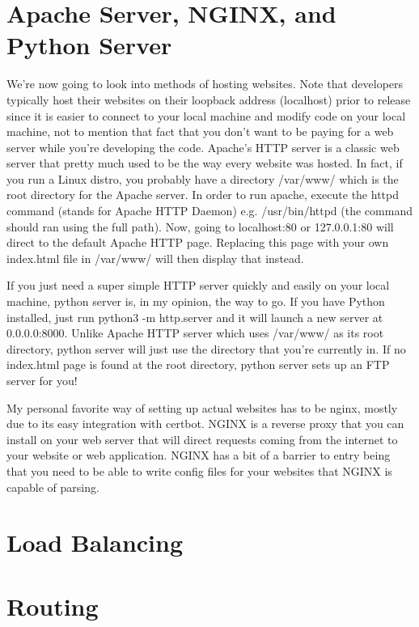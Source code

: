 \documentclass{article}
\begin{document}
\section{Apache Server, NGINX, and Python Server}

We're now going to look into methods of hosting websites. Note that developers typically host their websites on
their loopback address (localhost) prior to release since it is easier to connect to your local machine and
modify code on your local machine, not to mention that fact that you don't want to be paying for a web server
while you're developing the code. Apache's HTTP server is a classic web server that pretty much used to be the
way every website was hosted. In fact, if you run a Linux distro, you probably have a directory /var/www/ which
is the root directory for the Apache server. In order to run apache, execute the httpd command (stands for
Apache HTTP Daemon) e.g. /usr/bin/httpd (the command should ran using the full path). Now, going to
localhost:80 or 127.0.0.1:80 will direct to the default Apache HTTP page. Replacing this page with your own
index.html file in /var/www/ will then display that instead.

If you just need a super simple HTTP server quickly and easily on your local machine, python server is, in my
opinion, the way to go. If you have Python installed, just run python3 -m http.server and it will launch a new
server at 0.0.0.0:8000. Unlike Apache HTTP server which uses /var/www/ as its root directory, python server will
just use the directory that you're currently in. If no index.html page is found at the root directory, python
server sets up an FTP server for you!

My personal favorite way of setting up actual websites has to be nginx, mostly due to its easy integration with
certbot. NGINX is a reverse proxy that you can install on your web server that will direct requests coming
from the internet to your website or web application. NGINX has a bit of a barrier to entry being that you need
to be able to write config files for your websites that NGINX is capable of parsing.

\section{Load Balancing}

\section{Routing}
\end{document}
